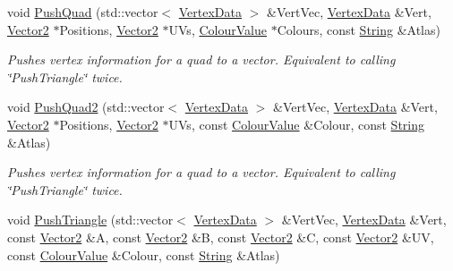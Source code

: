 \begin{DoxyCompactItemize}
\item 
\hypertarget{classMezzanine_1_1UI_1_1BasicRenderable_a9d082dd8ef8e96a44cf25cb96134b00d}{
void \hyperlink{classMezzanine_1_1UI_1_1BasicRenderable_a9d082dd8ef8e96a44cf25cb96134b00d}{PushQuad} (std::vector$<$ \hyperlink{structMezzanine_1_1UI_1_1VertexData}{VertexData} $>$ \&VertVec, \hyperlink{structMezzanine_1_1UI_1_1VertexData}{VertexData} \&Vert, \hyperlink{classMezzanine_1_1Vector2}{Vector2} $\ast$Positions, \hyperlink{classMezzanine_1_1Vector2}{Vector2} $\ast$UVs, \hyperlink{classMezzanine_1_1ColourValue}{ColourValue} $\ast$Colours, const \hyperlink{namespaceMezzanine_acf9fcc130e6ebf08e3d8491aebcf1c86}{String} \&Atlas)}
\label{classMezzanine_1_1UI_1_1BasicRenderable_a9d082dd8ef8e96a44cf25cb96134b00d}

\begin{DoxyCompactList}\small\item\em Pushes vertex information for a quad to a vector. Equivalent to calling \char`\"{}PushTriangle\char`\"{} twice. \item\end{DoxyCompactList}\item 
\hypertarget{classMezzanine_1_1UI_1_1BasicRenderable_ad1ffc15904a58792b13d0c3115272f81}{
void \hyperlink{classMezzanine_1_1UI_1_1BasicRenderable_ad1ffc15904a58792b13d0c3115272f81}{PushQuad2} (std::vector$<$ \hyperlink{structMezzanine_1_1UI_1_1VertexData}{VertexData} $>$ \&VertVec, \hyperlink{structMezzanine_1_1UI_1_1VertexData}{VertexData} \&Vert, \hyperlink{classMezzanine_1_1Vector2}{Vector2} $\ast$Positions, \hyperlink{classMezzanine_1_1Vector2}{Vector2} $\ast$UVs, const \hyperlink{classMezzanine_1_1ColourValue}{ColourValue} \&Colour, const \hyperlink{namespaceMezzanine_acf9fcc130e6ebf08e3d8491aebcf1c86}{String} \&Atlas)}
\label{classMezzanine_1_1UI_1_1BasicRenderable_ad1ffc15904a58792b13d0c3115272f81}

\begin{DoxyCompactList}\small\item\em Pushes vertex information for a quad to a vector. Equivalent to calling \char`\"{}PushTriangle\char`\"{} twice. \item\end{DoxyCompactList}\item 
\hypertarget{classMezzanine_1_1UI_1_1BasicRenderable_a7accb5b7dfea6d6c5cff88fd7f2e3a75}{
void \hyperlink{classMezzanine_1_1UI_1_1BasicRenderable_a7accb5b7dfea6d6c5cff88fd7f2e3a75}{PushTriangle} (std::vector$<$ \hyperlink{structMezzanine_1_1UI_1_1VertexData}{VertexData} $>$ \&VertVec, \hyperlink{structMezzanine_1_1UI_1_1VertexData}{VertexData} \&Vert, const \hyperlink{classMezzanine_1_1Vector2}{Vector2} \&A, const \hyperlink{classMezzanine_1_1Vector2}{Vector2} \&B, const \hyperlink{classMezzanine_1_1Vector2}{Vector2} \&C, const \hyperlink{classMezzanine_1_1Vector2}{Vector2} \&UV, const \hyperlink{classMezzanine_1_1ColourValue}{ColourValue} \&Colour, const \hyperlink{namespaceMezzanine_acf9fcc130e6ebf08e3d8491aebcf1c86}{String} \&Atlas)}
\label{classMezzanine_1_1UI_1_1BasicRenderable_a7accb5b7dfea6d6c5cff88fd7f2e3a75}


\end{DoxyCompactItemize}
